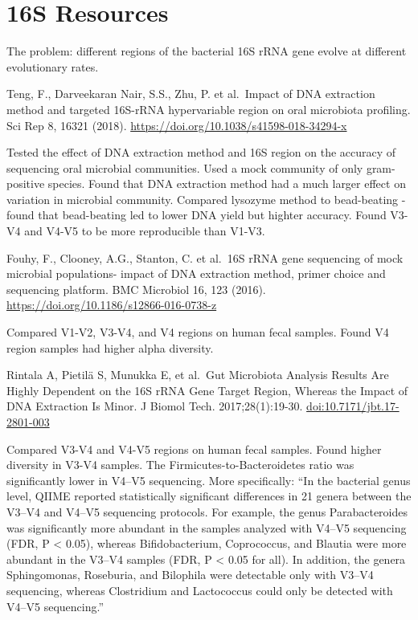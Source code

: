 \documentclass[
]{book}
\begin{document}
\hypertarget{s-resources}{%
\section{16S Resources}\label{s-resources}}

The problem: different regions of the bacterial 16S rRNA gene evolve at different evolutionary rates.

Teng, F., Darveekaran Nair, S.S., Zhu, P. et al.~Impact of DNA extraction method and targeted 16S-rRNA hypervariable region on oral microbiota profiling. Sci Rep 8, 16321 (2018). \url{https://doi.org/10.1038/s41598-018-34294-x}

Tested the effect of DNA extraction method and 16S region on the accuracy of sequencing oral microbial communities. Used a mock community of only gram-positive species. Found that DNA extraction method had a much larger effect on variation in microbial community. Compared lysozyme method to bead-beating - found that bead-beating led to lower DNA yield but highter accuracy. Found V3-V4 and V4-V5 to be more reproducible than V1-V3.

Fouhy, F., Clooney, A.G., Stanton, C. et al.~16S rRNA gene sequencing of mock microbial populations- impact of DNA extraction method, primer choice and sequencing platform. BMC Microbiol 16, 123 (2016). \url{https://doi.org/10.1186/s12866-016-0738-z}

Compared V1-V2, V3-V4, and V4 regions on human fecal samples. Found V4 region samples had higher alpha diversity.

Rintala A, Pietilä S, Munukka E, et al.~Gut Microbiota Analysis Results Are Highly Dependent on the 16S rRNA Gene Target Region, Whereas the Impact of DNA Extraction Is Minor. J Biomol Tech. 2017;28(1):19-30. \url{doi:10.7171/jbt.17-2801-003}

Compared V3-V4 and V4-V5 regions on human fecal samples. Found higher diversity in V3-V4 samples. The Firmicutes-to-Bacteroidetes ratio was significantly lower in V4--V5 sequencing. More specifically: ``In the bacterial genus level, QIIME reported statistically significant differences in 21 genera between the V3--V4 and V4--V5 sequencing protocols. For example, the genus Parabacteroides was significantly more abundant in the samples analyzed with V4--V5 sequencing (FDR, P \textless{} 0.05), whereas Bifidobacterium, Coprococcus, and Blautia were more abundant in the V3--V4 samples (FDR, P \textless{} 0.05 for all). In addition, the genera Sphingomonas, Roseburia, and Bilophila were detectable only with V3--V4 sequencing, whereas Clostridium and Lactococcus could only be detected with V4--V5 sequencing.''
\end{document}
